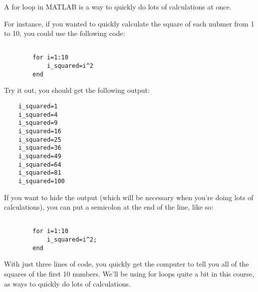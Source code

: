 \documentclass{ximera}
\begin{document}
\begin{exploration}
\begin{remark}
\end{remark}


  
  \begin{hint}
      
      A for loop in MATLAB is a way to quickly do lots of calculations at once.

  For instance, if you wanted to quickly calculate the square of each nubmer from 1 to 10, you could use the following code:
  \begin{verbatim}

        for i=1:10
            i_squared=i^2
        end

  \end{verbatim}

  Try it out, you should get the following output:

  \begin{verbatim}
    i_squared=1
    i_squared=4
    i_squared=9
    i_squared=16
    i_squared=25
    i_squared=36
    i_squared=49
    i_squared=64
    i_squared=81
    i_squared=100
  \end{verbatim}

  If you want to hide the output (which will be necessary when you're doing lots of calculations), you can put a semicolon at the end of the line, like so:

  \begin{verbatim}

        for i=1:10
            i_squared=i^2;
        end
  \end{verbatim}

  With just three lines of code, you quickly get the computer to tell you all of the squares of the first 10 numbers. We'll be using for loops quite a bit in this course, as ways to quickly do lots of calculations. 
  \end{hint}
\end{exploration}
\end{document}
